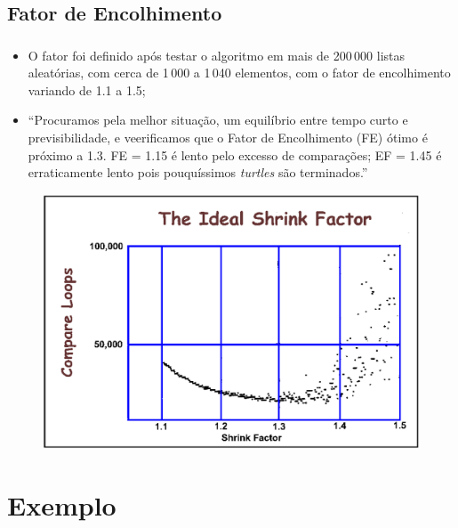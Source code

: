 \documentclass[aspectratio=169,table]{beamer}
\begin{document}
	\subsection{Fator de Encolhimento}
		\begin{frame}
			\frametitle{\secname}
			\framesubtitle{\subsecname}
			\begin{itemize}
				\item O fator foi definido após testar o algoritmo em mais de 200\,000 listas aleatórias, com cerca de 1\,000 a 1\,040 elementos, com o fator de encolhimento variando de 1.1 a 1.5;
				\item ``Procuramos pela melhor situação, um equilíbrio entre tempo curto e previsibilidade, e veerificamos que o Fator de Encolhimento (FE) ótimo é próximo a 1.3. FE = 1.15 é lento pelo excesso de comparações; EF = 1.45 é erraticamente lento pois pouquíssimos \textit{turtles} são terminados.''
			\end{itemize}
			\begin{figure}
				\includegraphics[height=.3\textheight]{Imagens/gap_image}
				\label{fig:perguntas}
			\end{figure}
		\end{frame}

\section{Exemplo}
\end{document}
